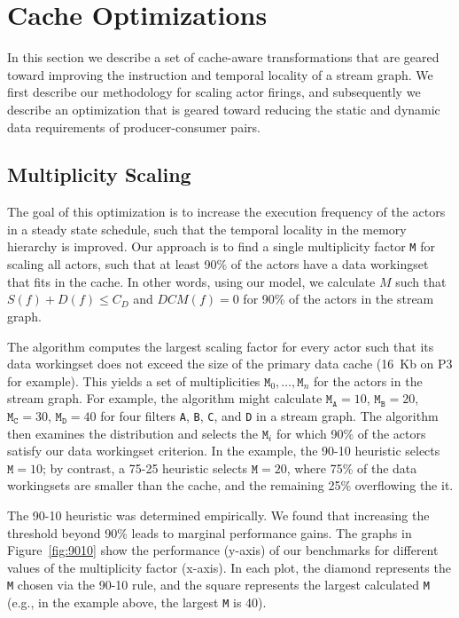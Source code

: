 \section{Cache Optimizations}
\label{sec:cache-opt}

In this section we describe a set of cache-aware transformations that
are geared toward improving the instruction and temporal locality of a
stream graph. We first describe our methodology for scaling actor
firings, and subsequently we describe an optimization that is geared
toward reducing the static and dynamic data requirements of
producer-consumer pairs.



\subsection{Multiplicity Scaling}

The goal of this optimization is to increase the execution frequency
of the actors in a steady state schedule, such that the temporal
locality in the memory hierarchy is improved. Our approach is to find a
single multiplicity factor \texttt{M} for scaling all actors, such that
at least 90\% of the actors have a data workingset that fits in the cache.
In other words, using our model, we calculate $M$ such that 
$S(f) + D(f) \leq C_D$ and $DCM(f) = 0$ for 90\% of the actors in the
stream graph.

The algorithm 
computes the largest scaling factor for every actor such that its data
workingset does not exceed the size of the primary data cache
(16~Kb on P3 for example). This yields a set of multiplicities
${\texttt{M}_0, \ldots, \texttt{M}_n}$ for the actors in the stream
graph. For example, the algorithm might calculate
$\texttt{M}_\texttt{A} = 10$,
$\texttt{M}_\texttt{B} = 20$, 
$\texttt{M}_\texttt{C} = 30$, 
$\texttt{M}_\texttt{D} = 40$ for four filters \texttt{A}, \texttt{B},
\texttt{C}, and \texttt{D} in a stream graph.
The algorithm then examines the
distribution and selects the $\texttt{M}_i$
for which 90\% of the actors satisfy our data workingset criterion.
In the example, the 90-10 heuristic
selects $\texttt{M} = 10$; by contrast,
a 75-25 heuristic selects $\texttt{M} = 20$, where 75\% of the
data workingsets are smaller than the cache, and the remaining 25\%
overflowing the it.

The 90-10 heuristic was determined empirically. We found that
increasing the threshold beyond 90\% leads to marginal
performance gains. The graphs in Figure~\ref{fig:9010} show the
performance (y-axis) of our benchmarks for different values of the multiplicity
factor (x-axis). In each plot, the diamond represents the \texttt{M} chosen via
the 90-10 rule, and the square represents the largest calculated
\texttt{M} (e.g., in the example above, the largest \texttt{M} is 40).

